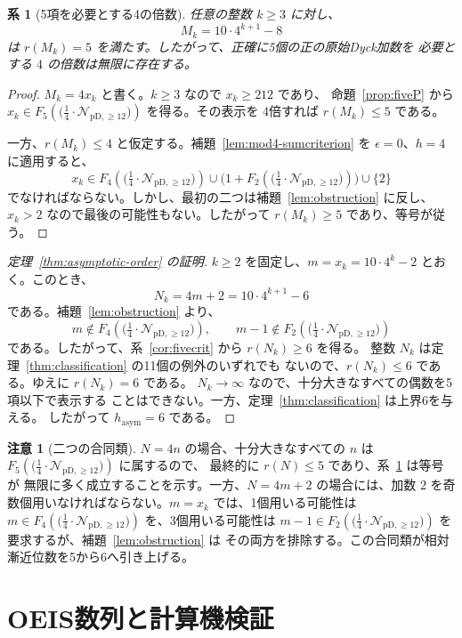 \documentclass[12pt]{ltjsarticle}
\theoremstyle{plain}
\newtheorem{corollary}[theorem]{系}
\theoremstyle{definition}
\newtheorem{remark}[theorem]{注意}
\theoremstyle{plain}
\newcommand{\Pset}{%
  \bigl(\tfrac{1}{4}\cdot\mathcal{N}_{\mathrm{pD},\geq 12}\bigr)%
}
\begin{document}
\begin{corollary}[5項を必要とする4の倍数]
\label{cor:five-multiples}
任意の整数 $k\geq3$ に対し、
\[
 M_k=10\cdot4^{k+1}-8
\]
は $r(M_k)=5$ を満たす。したがって、正確に5個の正の原始Dyck加数を
必要とする $4$ の倍数は無限に存在する。
\end{corollary}

\begin{proof}
$M_k=4x_k$ と書く。$k\geq3$ なので $x_k\geq212$ であり、
命題~\ref{prop:fiveP} から $x_k\in F_5(\Pset)$ を得る。その表示を
4倍すれば $r(M_k)\leq5$ である。

一方、$r(M_k)\leq4$ と仮定する。補題~\ref{lem:mod4-sumcriterion} を
$\epsilon=0$、$h=4$ に適用すると、
\[
 x_k\in F_4(\Pset)
 \cup\bigl(1+F_2(\Pset)\bigr)
 \cup\{2\}
\]
でなければならない。しかし、最初の二つは補題~\ref{lem:obstruction}
に反し、$x_k>2$ なので最後の可能性もない。したがって
$r(M_k)\geq5$ であり、等号が従う。
\end{proof}

\begin{proof}[定理~\ref{thm:asymptotic-order} の証明]
$k\geq2$ を固定し、$m=x_k=10\cdot4^k-2$ とおく。このとき、
\[
 N_k=4m+2=10\cdot4^{k+1}-6
\]
である。補題~\ref{lem:obstruction} より、
\[
 m\notin F_4(\Pset),
 \qquad
 m-1\notin F_2(\Pset)
\]
である。したがって、系~\ref{cor:fivecrit} から $r(N_k)\geq6$ を得る。
整数 $N_k$ は定理~\ref{thm:classification} の11個の例外のいずれでも
ないので、$r(N_k)\leq6$ である。ゆえに $r(N_k)=6$ である。
$N_k\to\infty$ なので、十分大きなすべての偶数を5項以下で表示する
ことはできない。一方、定理~\ref{thm:classification} は上界6を与える。
したがって $h_{\mathrm{asym}}=6$ である。
\end{proof}

\begin{remark}[二つの合同類]
$N=4n$ の場合、十分大きなすべての $n$ は $F_5(\Pset)$ に属するので、
最終的に $r(N)\leq5$ であり、系~\ref{cor:five-multiples} は等号が
無限に多く成立することを示す。一方、$N=4m+2$ の場合には、加数 $2$
を奇数個用いなければならない。$m=x_k$ では、1個用いる可能性は
$m\in F_4(\Pset)$ を、3個用いる可能性は
$m-1\in F_2(\Pset)$ を要求するが、補題~\ref{lem:obstruction} は
その両方を排除する。この合同類が相対漸近位数を5から6へ引き上げる。
\end{remark}

\section{OEIS数列と計算機検証}
\label{sec:oeis}
\end{document}
